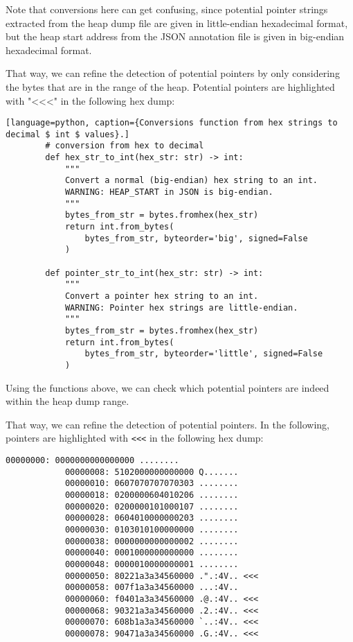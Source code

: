    Note that conversions here can get confusing, since potential pointer strings extracted from the heap dump file are given in little-endian hexadecimal format, but the heap start address from the JSON annotation file is given in big-endian hexadecimal format.

    \begin{minipage}{\dimexpr\linewidth-20pt}
        That way, we can refine the detection of potential pointers by only considering the bytes that are in the range of the heap. Potential pointers are highlighted with "<<<" in the following hex dump:

        \begin{lstlisting}[language=python, caption={Conversions function from hex strings to decimal $ int $ values}.]
        # conversion from hex to decimal
        def hex_str_to_int(hex_str: str) -> int:
            """
            Convert a normal (big-endian) hex string to an int.
            WARNING: HEAP_START in JSON is big-endian.
            """
            bytes_from_str = bytes.fromhex(hex_str)
            return int.from_bytes(
                bytes_from_str, byteorder='big', signed=False
            )
        
        def pointer_str_to_int(hex_str: str) -> int:
            """
            Convert a pointer hex string to an int.
            WARNING: Pointer hex strings are little-endian.
            """
            bytes_from_str = bytes.fromhex(hex_str)
            return int.from_bytes(
                bytes_from_str, byteorder='little', signed=False
            )
        \end{lstlisting}
    \end{minipage}

    Using the functions above, we can check which potential pointers are indeed within the heap dump range.

    \begin{minipage}{\dimexpr\linewidth-20pt}
        That way, we can refine the detection of potential pointers. In the following, pointers are highlighted with \lstinline[style=hexdump]!<<<! in the following hex dump:

        \begin{lstlisting}[style=hexdump, caption={8 bytes per line visualization of a Hex Dump from \textit{Training/basic/V\_7\_8\_P1/16/5070-1643978841-heap.raw}}]
            00000000: 0000000000000000 ........
            00000008: 5102000000000000 Q.......
            00000010: 0607070707070303 ........
            00000018: 0200000604010206 ........
            00000020: 0200000101000107 ........
            00000028: 0604010000000203 ........
            00000030: 0103010100000000 ........
            00000038: 0000000000000002 ........
            00000040: 0001000000000000 ........
            00000048: 0000010000000001 ........
            00000050: 80221a3a34560000 .".:4V.. <<<
            00000058: 007f1a3a34560000 ...:4V.. 
            00000060: f0401a3a34560000 .@.:4V.. <<<
            00000068: 90321a3a34560000 .2.:4V.. <<<
            00000070: 608b1a3a34560000 `..:4V.. <<<
            00000078: 90471a3a34560000 .G.:4V.. <<<
        \end{lstlisting}
    \end{minipage}

